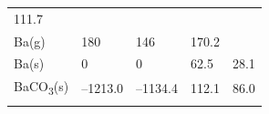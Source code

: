\documentclass[
]{book}
\theoremstyle{definition}
\theoremstyle{definition}
\theoremstyle{definition}
\theoremstyle{remark}
\begin{document}
\begin{longtable}[]{@{}lllll@{}}
\begin{minipage}[t]{0.18\columnwidth}
111.7\strut
\end{minipage}\tabularnewline
\begin{minipage}[t]{0.10\columnwidth}\raggedright
Ba(g)\strut
\end{minipage} & \begin{minipage}[t]{0.19\columnwidth}\raggedright
180\strut
\end{minipage} & \begin{minipage}[t]{0.20\columnwidth}\raggedright
146\strut
\end{minipage} & \begin{minipage}[t]{0.18\columnwidth}\raggedright
170.2\strut
\end{minipage} & \begin{minipage}[t]{0.18\columnwidth}\raggedright
\strut
\end{minipage}\tabularnewline
\begin{minipage}[t]{0.10\columnwidth}\raggedright
Ba(s)\strut
\end{minipage} & \begin{minipage}[t]{0.19\columnwidth}\raggedright
0\strut
\end{minipage} & \begin{minipage}[t]{0.20\columnwidth}\raggedright
0\strut
\end{minipage} & \begin{minipage}[t]{0.18\columnwidth}\raggedright
62.5\strut
\end{minipage} & \begin{minipage}[t]{0.18\columnwidth}\raggedright
28.1\strut
\end{minipage}\tabularnewline
\begin{minipage}[t]{0.10\columnwidth}\raggedright
BaCO\textsubscript{3}(s)\strut
\end{minipage} & \begin{minipage}[t]{0.19\columnwidth}\raggedright
--1213.0\strut
\end{minipage} & \begin{minipage}[t]{0.20\columnwidth}\raggedright
--1134.4\strut
\end{minipage} & \begin{minipage}[t]{0.18\columnwidth}\raggedright
112.1\strut
\end{minipage} & \begin{minipage}[t]{0.18\columnwidth}\raggedright
86.0\strut
\end{minipage}\tabularnewline
\begin{minipage}[t]{0.10\columnwidth}\raggedright

\end{minipage}
\end{longtable}
\end{document}
